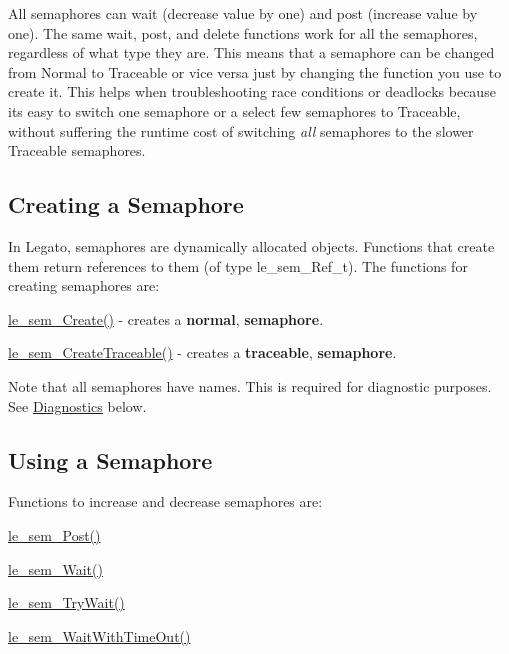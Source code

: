 All semaphores can wait (decrease value by one) and post (increase value by one). The same wait, post, and delete functions work for all the semaphores, regardless of what type they are. This means that a semaphore can be changed from Normal to Traceable or vice versa just by changing the function you use to create it. This helps when troubleshooting race conditions or deadlocks because it\textquotesingle{}s easy to switch one semaphore or a select few semaphores to Traceable, without suffering the runtime cost of switching {\itshape all} semaphores to the slower Traceable semaphores.\hypertarget{c_semaphore_create_semaphore}{}\subsection{Creating a Semaphore}\label{c_semaphore_create_semaphore}
In Legato, semaphores are dynamically allocated objects. Functions that create them return references to them (of type le\+\_\+sem\+\_\+\+Ref\+\_\+t). The functions for creating semaphores are\+:
\begin{DoxyItemize}
\item \hyperlink{le__semaphore_8h_add9fab5440abcff5a8bc3b8bd1126d99}{le\+\_\+sem\+\_\+\+Create()} -\/ creates a {\bfseries normal}, {\bfseries semaphore}.
\item \hyperlink{le__semaphore_8h_a27f805b9351bb5bb4a5fd6db6cbff982}{le\+\_\+sem\+\_\+\+Create\+Traceable()} -\/ creates a {\bfseries traceable}, {\bfseries semaphore}.
\end{DoxyItemize}

Note that all semaphores have names. This is required for diagnostic purposes. See \hyperlink{c_semaphore_diagnostics_semaphore}{Diagnostics} below.\hypertarget{c_semaphore_use_semaphore}{}\subsection{Using a Semaphore}\label{c_semaphore_use_semaphore}
Functions to increase and decrease semaphores are\+:
\begin{DoxyItemize}
\item {\ttfamily \hyperlink{le__semaphore_8h_abb859411cc58fbcc576c986ef52083b2}{le\+\_\+sem\+\_\+\+Post()}} 
\item {\ttfamily \hyperlink{le__semaphore_8h_aecdf87fe330dd008771b7530edbb1f2b}{le\+\_\+sem\+\_\+\+Wait()}} 
\item {\ttfamily \hyperlink{le__semaphore_8h_a6a6c435042dd37a3c78ebbab6ec72689}{le\+\_\+sem\+\_\+\+Try\+Wait()}} 
\item {\ttfamily \hyperlink{le__semaphore_8h_a14475f0c2f5483427279d39220f55eaa}{le\+\_\+sem\+\_\+\+Wait\+With\+Time\+Out()}} 
\end{DoxyItemize}

